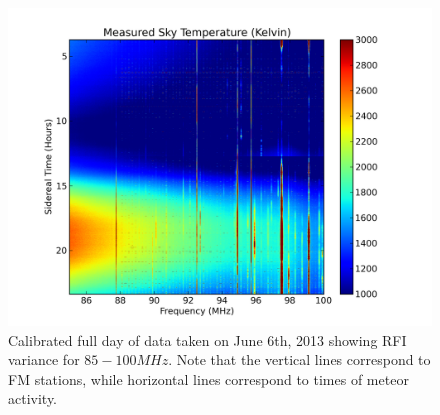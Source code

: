 \begin{figure}[htb]
\begin{center}
\includegraphics[width=0.9\linewidth]{Data_analysis/figures/June_06_unmasked_cal_waterfall_FM.png}
\caption{Calibrated full day of data taken on June 6th, 2013 showing RFI variance for $85-100 MHz$. Note that the vertical lines correspond to FM stations, while horizontal lines correspond to times of meteor activity. }
\label{Fig:RFI_wf_long}
\end{center}
\end{figure}

